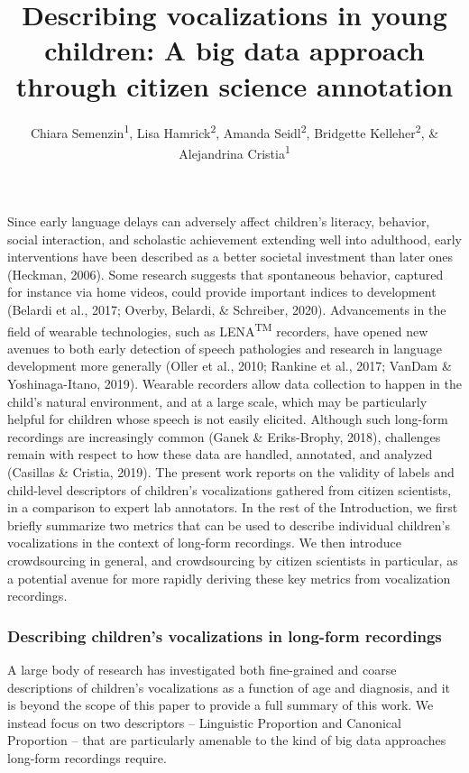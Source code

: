 \documentclass[english,,man]{apa6}
\author{Chiara Semenzin\textsuperscript{1}, Lisa Hamrick\textsuperscript{2}, Amanda Seidl\textsuperscript{2}, Bridgette Kelleher\textsuperscript{2}, \& Alejandrina Cristia\textsuperscript{1}}
\affiliation{
\vspace{0.5cm}
\textsuperscript{1} Laboratoire de Sciences Cognitives et de Psycholinguistique, Département d'Etudes cognitives, ENS, EHESS, CNRS, PSL University\\\textsuperscript{2} Purdue University}
\title{Describing vocalizations in young children: A big data approach through citizen science annotation}
\date{}
\begin{document}
\maketitle

Since early language delays can adversely affect children's literacy, behavior, social interaction, and scholastic achievement extending well into adulthood, early interventions have been described as a better societal investment than later ones (Heckman, 2006). Some research suggests that spontaneous behavior, captured for instance via home videos, could provide important indices to development (Belardi et al., 2017; Overby, Belardi, \& Schreiber, 2020). Advancements in the field of wearable technologies, such as LENA\textsuperscript{TM} recorders, have opened new avenues to both early detection of speech pathologies and research in language development more generally (Oller et al., 2010; Rankine et al., 2017; VanDam \& Yoshinaga-Itano, 2019). Wearable recorders allow data collection to happen in the child's natural environment, and at a large scale, which may be particularly helpful for children whose speech is not easily elicited. Although such long-form recordings are increasingly common (Ganek \& Eriks-Brophy, 2018), challenges remain with respect to how these data are handled, annotated, and analyzed (Casillas \& Cristia, 2019). The present work reports on the validity of labels and child-level descriptors of children's vocalizations gathered from citizen scientists, in a comparison to expert lab annotators. In the rest of the Introduction, we first briefly summarize two metrics that can be used to describe individual children's vocalizations in the context of long-form recordings. We then introduce crowdsourcing in general, and crowdsourcing by citizen scientists in particular, as a potential avenue for more rapidly deriving these key metrics from vocalization recordings.

\hypertarget{describing-childrens-vocalizations-in-long-form-recordings}{%
\subsubsection{Describing children's vocalizations in long-form recordings}\label{describing-childrens-vocalizations-in-long-form-recordings}}

A large body of research has investigated both fine-grained and coarse descriptions of children's vocalizations as a function of age and diagnosis, and it is beyond the scope of this paper to provide a full summary of this work. We instead focus on two descriptors -- Linguistic Proportion and Canonical Proportion -- that are particularly amenable to the kind of big data approaches long-form recordings require.
\end{document}
